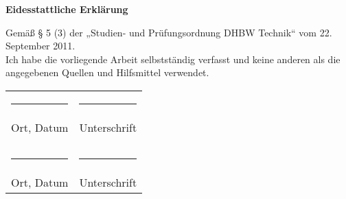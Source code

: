 \newpage

\vspace*{\fill}																%

{

\begin{center}
	\huge {\bf Eidesstattliche Erklärung}
	\label{cha:eidesstattlicheErklaerung}
\end{center}

\vspace{2cm}

Gemäß § 5 (3) der „Studien- und Prüfungsordnung DHBW Technik“ vom 22. September 2011.\\
Ich habe die vorliegende Arbeit selbstständig verfasst und keine anderen als die angegebenen 
Quellen und Hilfsmittel verwendet. \\
\vspace{2cm}


\begin{table}[h]
		\begin{tabular}{ll}
\rule{6.5cm}{0.3pt} & \rule{6.5cm}{0.3pt}\\
Ort, Datum  & Unterschrift\\
&\\
&\\
\rule{6.5cm}{0.3pt} & \rule{6.5cm}{0.3pt}\\
Ort, Datum  & Unterschrift\\
		\end{tabular}
\end{table}

}

\vspace*{\fill}
\newpage